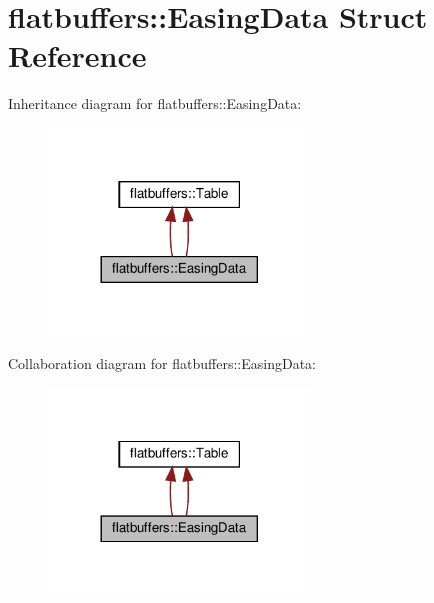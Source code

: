 \hypertarget{structflatbuffers_1_1EasingData}{}\section{flatbuffers\+:\+:Easing\+Data Struct Reference}
\label{structflatbuffers_1_1EasingData}


Inheritance diagram for flatbuffers\+:\+:Easing\+Data\+:
\nopagebreak
\begin{figure}[H]
\begin{center}
\leavevmode
\includegraphics[width=197pt]{structflatbuffers_1_1EasingData__inherit__graph}
\end{center}
\end{figure}


Collaboration diagram for flatbuffers\+:\+:Easing\+Data\+:
\nopagebreak
\begin{figure}[H]
\begin{center}
\leavevmode
\includegraphics[width=197pt]{structflatbuffers_1_1EasingData__coll__graph}
\end{center}
\end{figure}
